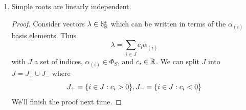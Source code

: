 \begin{enumerate}
\begin{proof}
    \end{proof}
    \item Simple roots are linearly independent.
    \begin{proof}
    Consider vectors $\lambda\in \mathfrak{h}^*_{\mathbb{R}}$ which can be written in terms of the $\alpha_{(i)}$ basis elements. Thus
    $$\lambda=\sum_{i\in J} c_i \alpha_{(i)}$$
    with $J$ a set of indices, $\alpha_{(i)}\in \Phi_S$, and $c_i\in \mathbb{R}$. We can split $J$ into $J=J_+ \cup J_-$ where
    $$J_+=\{i\in J: c_i >0\},J_-=\{i\in J: c_i <0\}$$
    We'll finish the proof next time.
    \end{proof}
\end{enumerate}
